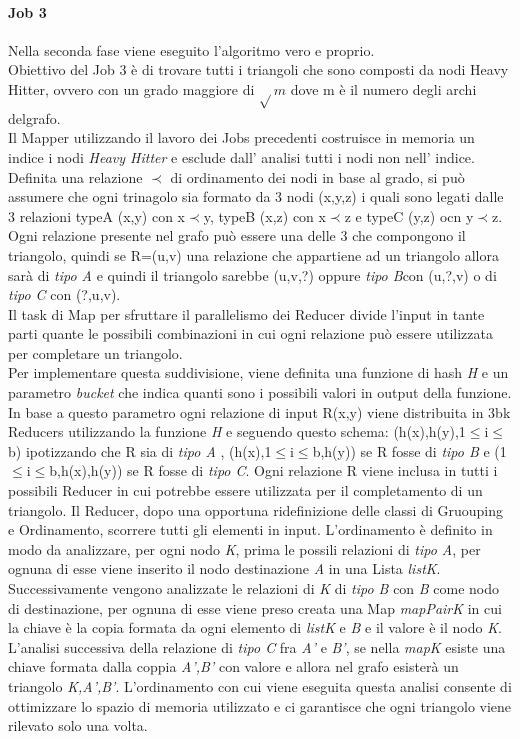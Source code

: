 \documentclass[paper=a4, fontsize=11pt]{scrartcl}	%
\numberwithin{equation}{section}															%
\numberwithin{figure}{section}																%
\numberwithin{table}{section}																%
\begin{document}
\paragraph{Job 3}
Nella seconda fase viene eseguito l'algoritmo vero e proprio.\\
Obiettivo del Job 3 è di trovare tutti i triangoli che sono composti da nodi Heavy Hitter, ovvero con un grado maggiore di $\sqrt{} m$ dove m è il numero degli archi delgrafo.\\
Il Mapper utilizzando il lavoro dei Jobs precedenti costruisce in memoria un indice i nodi \textit{Heavy Hitter} e esclude dall' analisi tutti i nodi non nell' indice.\\
Definita una relazione $\prec$ di ordinamento dei nodi in base al grado, si può assumere che ogni trinagolo sia formato da 3 nodi (x,y,z) i quali sono legati dalle 3 relazioni typeA (x,y) con x$\prec$y, typeB (x,z) con x$\prec$z e typeC (y,z) ocn y$\prec$z.\\
Ogni relazione presente nel grafo può essere una delle 3 che compongono il triangolo, quindi se R=(u,v) una relazione che appartiene ad un triangolo allora sarà di \textit{tipo A} e quindi  il triangolo sarebbe (u,v,?) oppure \textit{tipo B}con (u,?,v) o di \textit{tipo C} con (?,u,v).\\
Il task di Map per sfruttare il parallelismo dei Reducer divide l'input in tante parti quante le possibili combinazioni in cui ogni relazione può essere utilizzata per completare un triangolo.\\
Per implementare questa suddivisione, viene definita una funzione di hash \textit{H} e un parametro \textit{bucket} che indica quanti sono i possibili valori in output della funzione. In base a questo parametro ogni relazione di input R(x,y) viene distribuita in 3bk Reducers utilizzando la funzione \textit{H} e seguendo questo schema: (h(x),h(y),1$\leq$i$\leq$b) ipotizzando che R sia di \textit{tipo A} , (h(x),1$\leq$i$\leq$b,h(y)) se R fosse di \textit{tipo B} e (1$\leq$i$\leq$b,h(x),h(y)) se R fosse di \textit{tipo C}. Ogni relazione R viene inclusa in tutti i possibili Reducer in cui potrebbe essere utilizzata per il completamento di un triangolo.
Il Reducer, dopo una opportuna ridefinizione delle classi di Gruouping e Ordinamento, scorrere tutti gli elementi in input. L'ordinamento è definito in modo da analizzare, per ogni nodo \textit{K}, prima le possili relazioni di \textit{tipo A}, per ognuna di esse viene inserito il nodo destinazione \textit{A} in una Lista \textit{listK}. Successivamente vengono analizzate le relazioni di \textit{K} di \textit{tipo B} con \textit{B} come nodo di destinazione, per ognuna di esse viene preso creata una Map \textit{mapPairK} in cui la chiave è la copia formata da ogni elemento di \textit{listK} e \textit{B} e il valore è il nodo \textit{K}.
L'analisi successiva della relazione di \textit{tipo C} fra \textit{A'} e \textit{B'}, se nella \textit{mapK} esiste una chiave formata dalla coppia  \textit{A',B'} con valore e allora nel grafo esisterà un triangolo \textit{K,A',B'}.
L'ordinamento con cui viene eseguita questa analisi consente di ottimizzare lo spazio di memoria utilizzato e ci garantisce che ogni triangolo viene rilevato solo una volta.
\end{document}
